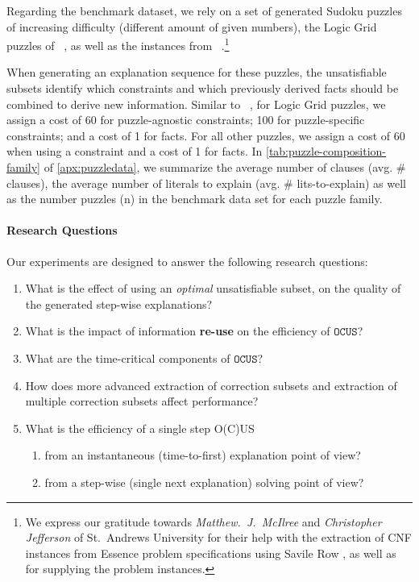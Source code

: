 \documentclass[twoside,11pt]{article}
\newcommand\citet[1]{\citeauthor{#1}~\citeyear{#1}}
\newcommand\comment[1]{\marginpar{\tiny #1}}
\renewcommand\comment[1]{#1}
\newcommand{\tias}[1]{{\comment{\color{blue}Tias:#1}}}
\newcommand\mm[1]{\ensuremath{#1}\xspace}
\newcommand\call[1]{\mm{\texttt{#1}}}
\newcommand\comus{\mm{\call{OCUS}}}
\begin{document}
Regarding the benchmark dataset, we rely on a set of generated Sudoku puzzles of increasing difficulty (different amount of given numbers), the Logic Grid puzzles of \citet{bogaerts2021framework}, as well as the instances from \citet{schotten}.\footnote{We express our gratitude towards \emph{Matthew.~J.~McIlree} and \emph{Christopher Jefferson} of St.~Andrews University for their help with the extraction of CNF instances from Essence problem specifications \cite{frisch2008essence} using Savile Row \cite{nightingale2017automatically}, as well as for supplying the problem instances.}

When generating an explanation sequence for these puzzles, the unsatisfiable subsets identify which constraints and which previously derived facts should be combined to derive new information. 
Similar to \citet{ijcai2021}, for Logic Grid puzzles, we assign a cost of 60 for puzzle-agnostic constraints; 100 for puzzle-specific constraints; and a cost of 1 for facts. 
For all other puzzles, we assign a cost of 60 when using a constraint and a cost of 1 for facts.
In  \cref{tab:puzzle-composition-family} of \cref{apx:puzzledata}, we summarize the average number of clauses (avg. $\#$ {clauses}), the average number of literals to explain (avg. $\#$ lits-to-explain) as well as the number puzzles (n) in the benchmark data set for each puzzle family. 
\paragraph{Research Questions} Our experiments are designed to answer the following research questions:  

\begin{enumerate}[label={Q\arabic*}, ref={Q\arabic*}]
\item  What is the effect of using an \textit{optimal} unsatisfiable subset, on the quality of the generated step-wise explanations? \label{rq:q1}
\item What is the impact of information \textbf{re-use} on the efficiency of \comus? \label{rq:information-reuse}
\item What are the time-critical components of \comus?\label{rq:time-critical}
\item  How does more advanced extraction of correction subsets and extraction of multiple correction subsets affect performance?\label{rq:q3}
\item   What is the efficiency of a single step O(C)US

\begin{enumerate}
	\item from an instantaneous (time-to-first) explanation  point of view?
    \item from a step-wise (single next explanation) solving point of view?
\end{enumerate} \label{rq:q4}%
\end{enumerate}
\end{document}
